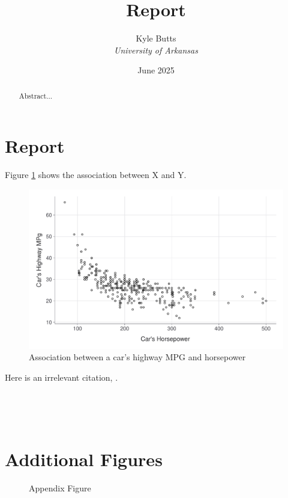 \documentclass[12pt]{article}
\title{Report}
\author{Kyle Butts \\ \emph{University of Arkansas}}
\date{June 2025}
\begin{document}
\maketitle
\begin{abstract}
  Abstract...
\end{abstract}
\newpage


\section{Report}

Figure \ref{fig:hp_vs_mpg} shows the association between X and Y.

\begin{figure}[htb!]
  \caption{Association between a car's highway MPG and horsepower}
  \label{fig:hp_vs_mpg}

  \includegraphics[width = \textwidth]{figures/car_hp_vs_mpg.pdf}
\end{figure}


Here is an irrelevant citation, \citet{gentzkow2014code}.







\newpage~

\newpage~\appendix
{}
\setcounter{table}{0}
\setcounter{figure}{0}
\renewcommand{\thetable}{\thesection\arabic{table}}
\renewcommand{\thefigure}{\thesection\arabic{figure}}

\setcounter{equation}{0}

\section{Additional Figures}

\begin{figure}[htb!]
  \caption{Appendix Figure}
  \label{fig:appendix_1}

\end{figure}
\end{document}
